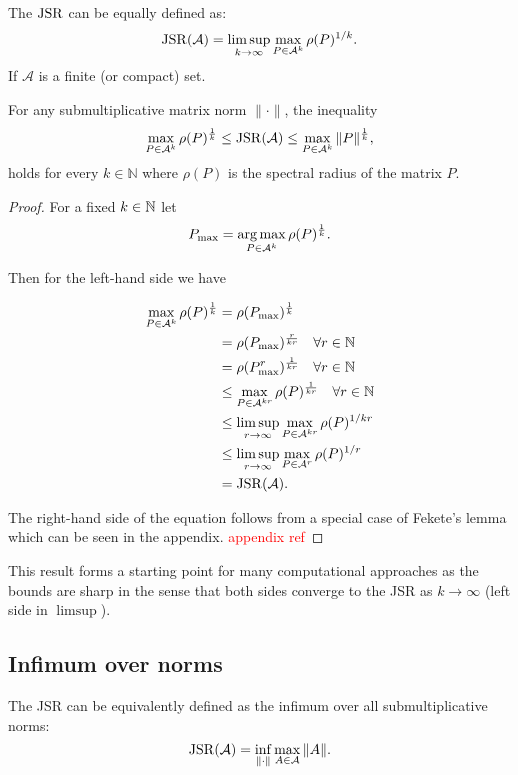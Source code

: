 \begin{proposition}
    The $\operatorname{JSR}$ can be equally defined as:
    $$
    \operatorname{JSR}(\mathcal{A}) = \limsup_{k \to \infty} \max_{P \in \mathcal{A}^k} \rho(P)^{1/k}.
    $$
    If $\mathcal{A}$ is a finite (or compact) set.
\end{proposition}

\begin{proposition}
    For any submultiplicative matrix norm $\|\cdot\|$, the inequality
    \begin{equation}
    \max_{P \in \mathcal{A}^k} \rho(P)^{\frac{1}{k}} \leq \operatorname{JSR}(\mathcal{A}) \leq \max_{P \in \mathcal{A}^k} \| P\|^{\frac{1}{k}},
    \label{eq:three-member}
    \end{equation}
    holds for every $k \in \mathbb{N}$ where $\rho(P)$ is the spectral radius of the matrix $P$.
\end{proposition}
\begin{proof}
    For a fixed $k \in \mathbb{N}$ let 
    $$
    P_{\text{max}} = \operatorname*{arg\,max}_{P \in \mathcal{A}^k} \rho(P)^{\frac{1}{k}}.
    $$ 

    Then for the left-hand side we have

    \begin{align*}
        \max_{P \in \mathcal{A}^k} \rho(P)^{\frac{1}{k}} & = \rho(P_{\text{max}})^{\frac{1}{k}} \\
        & = \rho(P_{\text{max}})^{\frac{r}{kr}} \quad \forall r \in \mathbb{N} \\
        & = \rho(P_{\text{max}}^{r})^{\frac{1}{kr}} \quad \forall r \in \mathbb{N}\\
        & \leq \max_{P \in \mathcal{A}^{kr}} \rho(P)^{\frac{1}{kr}} \quad \forall r \in \mathbb{N}\\
        & \leq \limsup_{r \to \infty} \max_{P \in \mathcal{A}^{kr}} \rho(P)^{1/kr}\\
        & \leq \limsup_{r \to \infty} \max_{P \in \mathcal{A}^{r}} \rho(P)^{1/r}\\
        & = \operatorname{JSR}(\mathcal{A}).
    \end{align*}

    The right-hand side of the equation follows from a special case of Fekete's lemma which can be seen in the appendix. 
    \textcolor{red}{appendix ref} 
\end{proof}
This result forms a starting point for many computational approaches as the bounds are sharp in the sense that both sides converge to the JSR as $k\rightarrow \infty$ (left side in $\limsup$).

\subsection*{Infimum over norms}
\begin{proposition}
    The JSR can be equivalently defined as the infimum over all submultiplicative norms:
    \begin{equation}
        \operatorname{JSR}(\mathcal{A}) = \inf_{\|\cdot\|} \max_{A \in \mathcal{A}} \|A\|.
    \end{equation}
\end{proposition}


